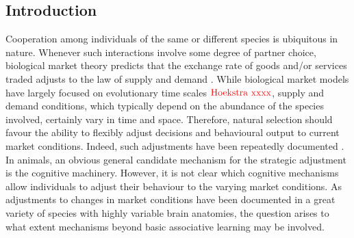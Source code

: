 \documentclass[]{rsos}%
\begin{document}
\providecommand{\tightlist}{%
  \setlength{\itemsep}{0pt}\setlength{\parskip}{0pt}}
\providecommand{\EndFirstPage}{%
}

\maketitle

\hypertarget{introduction}{%
\subsection{Introduction}\label{introduction}}

Cooperation among individuals of the same or different species is
ubiquitous in nature. Whenever such interactions involve some degree
of partner choice, biological market theory predicts that the exchange
rate of goods and/or services traded adjusts to the law of supply and demand
\citep{noe_Biological_1995a}. While biological market models have largely focused
on evolutionary time scales \citep{noe_Biological_1994a, johnstone_Mutualism_2008a}
\(\color{red}{\text{Hoekstra xxxx}}\), supply and demand conditions, which typically
depend on the abundance of the species involved, certainly vary in time
and space. Therefore, natural selection should
favour the ability to flexibly adjust decisions and behavioural output to
current market conditions. Indeed, such adjustments have been repeatedly
documented \citep{axen_Signalling_1996}. In animals, an obvious general candidate
mechanism for the strategic adjustment is the cognitive machinery. However,
it is not clear which cognitive mechanisms allow individuals to adjust their
behaviour to the varying market conditions. As adjustments to changes in
market conditions have been documented in a great variety of species with
highly variable brain anatomies, the question arises to what extent mechanisms
beyond basic associative learning may be involved.
\end{document}
